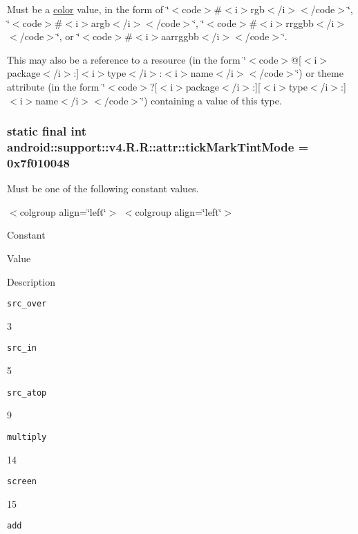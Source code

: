 Must be a \hyperlink{classandroid_1_1support_1_1v4_1_1_r_1_1color}{color} value, in the form of \char`\"{}$<$code$>$\#$<$i$>$rgb$<$/i$>$$<$/code$>$\char`\"{}, \char`\"{}$<$code$>$\#$<$i$>$argb$<$/i$>$$<$/code$>$\char`\"{}, \char`\"{}$<$code$>$\#$<$i$>$rrggbb$<$/i$>$$<$/code$>$\char`\"{}, or \char`\"{}$<$code$>$\#$<$i$>$aarrggbb$<$/i$>$$<$/code$>$\char`\"{}. 

This may also be a reference to a resource (in the form \char`\"{}$<$code$>$@\mbox{[}$<$i$>$package$<$/i$>$:\mbox{]}$<$i$>$type$<$/i$>$:$<$i$>$name$<$/i$>$$<$/code$>$\char`\"{}) or theme attribute (in the form \char`\"{}$<$code$>$?\mbox{[}$<$i$>$package$<$/i$>$:\mbox{]}\mbox{[}$<$i$>$type$<$/i$>$:\mbox{]}$<$i$>$name$<$/i$>$$<$/code$>$\char`\"{}) containing a value of this type. \hypertarget{classandroid_1_1support_1_1v4_1_1_r_1_1attr_4f86271c7af7da84aae0d28bfe8da8dc}{
\subsubsection[{tickMarkTintMode}]{\setlength{\rightskip}{0pt plus 5cm}static final int android::support::v4.R.R::attr::tickMarkTintMode = 0x7f010048}}
\label{classandroid_1_1support_1_1v4_1_1_r_1_1attr_4f86271c7af7da84aae0d28bfe8da8dc}


Must be one of the following constant values. \begin{TabularC}{0}
\hline
\end{TabularC}
$<$colgroup align=\char`\"{}left\char`\"{}$>$ $<$colgroup align=\char`\"{}left\char`\"{}$>$ 

Constant

Value

Description 

{\tt src\_\-over}

3

{\tt src\_\-in}

5

{\tt src\_\-atop}

9

{\tt multiply}

14

{\tt screen}

15

{\tt add}

